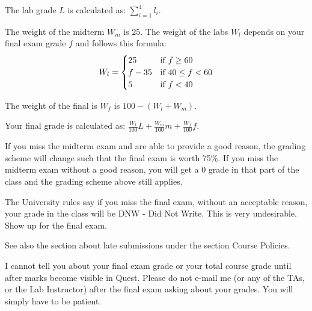 \documentclass[letterpaper,10pt]{article}
\begin{document}
The lab grade $L$ is calculated as: $\sum_{i=1}^{4}l_{i}$.

The weight of the midterm $W_{m}$ is $25$. The weight of the labs $W_{l}$ depends on your final exam grade $f$ and follows this formula:
\[
 W_{l} = \begin{cases}
        25      & $if~$ f \ge 60\\
        f - 35  & $if~$ 40 \le f < 60\\
        5       & $if~$ f < 40
        \end{cases}
\]

The weight of the final is $W_{f}$ is $100 - (W_{l} + W_{m})$.

Your final grade is calculated as: $\frac{W_{l}}{100}L + \frac{W_{m}}{100}m + \frac{W_{f}}{100}f $.

If you miss the midterm exam and are able to provide a good reason, the grading scheme will change such that the final exam is worth 75\%. If you miss the midterm exam without a good reason, you will get a 0 grade in that part of the class and the grading scheme above still applies.

The University rules say if you miss the final exam, without an acceptable reason, your grade in the class will be DNW - Did Not Write. This is very undesirable. Show up for the final exam.

See also the section about late submissions under the section Course Policies.

I cannot tell you about your final exam grade or your total course grade until after marks become visible in Quest. Please do not e-mail me (or any of the TAs, or the Lab Instructor) after the final exam asking about your grades. You will simply have to be patient.


\end{document}
